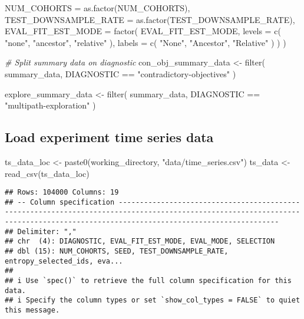 \documentclass[
]{book}
\newenvironment{Shaded}{\begin{snugshade}}{\end{snugshade}}
\newcommand{\AttributeTok}[1]{\textcolor[rgb]{0.77,0.63,0.00}{#1}}
\newcommand{\CommentTok}[1]{\textcolor[rgb]{0.56,0.35,0.01}{\textit{#1}}}
\newcommand{\FunctionTok}[1]{\textcolor[rgb]{0.00,0.00,0.00}{#1}}
\newcommand{\NormalTok}[1]{#1}
\newcommand{\OtherTok}[1]{\textcolor[rgb]{0.56,0.35,0.01}{#1}}
\newcommand{\SpecialCharTok}[1]{\textcolor[rgb]{0.00,0.00,0.00}{#1}}
\newcommand{\StringTok}[1]{\textcolor[rgb]{0.31,0.60,0.02}{#1}}
\begin{document}
\begin{Shaded}
\begin{Highlighting}[]
    \AttributeTok{NUM\_COHORTS =} \FunctionTok{as.factor}\NormalTok{(NUM\_COHORTS),}
    \AttributeTok{TEST\_DOWNSAMPLE\_RATE =} \FunctionTok{as.factor}\NormalTok{(TEST\_DOWNSAMPLE\_RATE),}
    \AttributeTok{EVAL\_FIT\_EST\_MODE =} \FunctionTok{factor}\NormalTok{(}
\NormalTok{      EVAL\_FIT\_EST\_MODE,}
      \AttributeTok{levels =} \FunctionTok{c}\NormalTok{(}
        \StringTok{"none"}\NormalTok{,}
        \StringTok{"ancestor"}\NormalTok{,}
        \StringTok{"relative"}
\NormalTok{      ),}
      \AttributeTok{labels =} \FunctionTok{c}\NormalTok{(}
        \StringTok{"None"}\NormalTok{,}
        \StringTok{"Ancestor"}\NormalTok{,}
        \StringTok{"Relative"}
\NormalTok{      )}
\NormalTok{    )}
\NormalTok{  )}

\CommentTok{\# Split summary data on diagnostic}
\NormalTok{con\_obj\_summary\_data }\OtherTok{\textless{}{-}} \FunctionTok{filter}\NormalTok{(}
\NormalTok{  summary\_data,}
\NormalTok{  DIAGNOSTIC }\SpecialCharTok{==} \StringTok{"contradictory{-}objectives"}
\NormalTok{)}

\NormalTok{explore\_summary\_data }\OtherTok{\textless{}{-}} \FunctionTok{filter}\NormalTok{(}
\NormalTok{  summary\_data,}
\NormalTok{  DIAGNOSTIC }\SpecialCharTok{==} \StringTok{"multipath{-}exploration"}
\NormalTok{)}
\end{Highlighting}
\end{Shaded}

\hypertarget{load-experiment-time-series-data}{%
\subsection{Load experiment time series data}\label{load-experiment-time-series-data}}

\begin{Shaded}
\begin{Highlighting}[]
\NormalTok{ts\_data\_loc }\OtherTok{\textless{}{-}} \FunctionTok{paste0}\NormalTok{(working\_directory, }\StringTok{"data/time\_series.csv"}\NormalTok{)}
\NormalTok{ts\_data }\OtherTok{\textless{}{-}} \FunctionTok{read\_csv}\NormalTok{(ts\_data\_loc)}
\end{Highlighting}
\end{Shaded}

\begin{verbatim}
## Rows: 104000 Columns: 19
## -- Column specification ----------------------------------------------------------------------------------------------------------------------------------------------------------------------------------
## Delimiter: ","
## chr  (4): DIAGNOSTIC, EVAL_FIT_EST_MODE, EVAL_MODE, SELECTION
## dbl (15): NUM_COHORTS, SEED, TEST_DOWNSAMPLE_RATE, entropy_selected_ids, eva...
## 
## i Use `spec()` to retrieve the full column specification for this data.
## i Specify the column types or set `show_col_types = FALSE` to quiet this message.
\end{verbatim}
\end{document}
